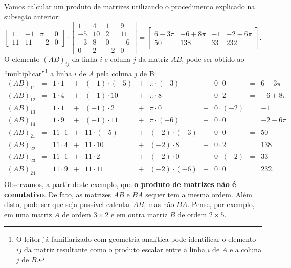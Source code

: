 \documentclass[../livro.tex]{subfiles}  %
\begin{document}
\begin{example} Vamos calcular um produto de matrizes utilizando o procedimento explicado na subseção anterior:
	\begin{equation}
	\left[
	\begin{array}{cccc}
	1 & -1 & \pi & 0 \\
	11 & 11 & -2 & 0 
	\end{array}
	\right] \cdot
	\left[
	\begin{array}{cccc}
	1 & 4 & 1 & 9 \\
	-5 & 10 & 2 & 11 \\
	-3 & 8 & 0 & -6 \\
	0 & 2 & -2 & 0 
	\end{array}
	\right]  =
	\left[
	\begin{array}{cccc}
	6-3\pi   & -6 + 8\pi &   -1   &  -2 - 6 \pi  \\
	50      &  138      &  33    &  232         
	\end{array}
	\right].
	\end{equation} O elemento $(AB)_{ij}$ da linha $i$ e coluna $j$ da matriz $AB$, pode ser obtido ao ``multiplicar''\footnote{O leitor já familiarizado com geometria analítica pode identificar o elemento $ij$ da matriz resultante como o produto escalar entre a linha $i$ de $A$ e a coluna $j$ de $B$.} a linha $i$ de $A$ pela coluna $j$ de B:
	\begin{equation}
	\begin{array}{ccccccccccc}
	(AB)_{11} & = & 1\cdot 1 & + & (-1)\cdot(-5)  & + & \pi \cdot (-3) & + & 0\cdot 0    & = & 6-3\pi \\
	(AB)_{12} & = & 1\cdot 4 & + & (-1)\cdot 10   & + & \pi \cdot 8    & + & 0\cdot 2    & = & -6 + 8 \pi \\
	(AB)_{13} & = & 1\cdot 1 & + & (-1)\cdot 2    & + & \pi \cdot 0    & + & 0\cdot (-2) & = & -1 \\
	(AB)_{14} & = & 1\cdot 9 & + & (-1)\cdot 11   & + & \pi \cdot (-6) & + & 0\cdot 0    & = & -2-6\pi \\
	(AB)_{21} & = & 11\cdot 1& + & 11\cdot(-5)    & + & (-2)\cdot(-3)  & + & 0\cdot 0    & = & 50 \\
	(AB)_{22} & = & 11\cdot 4& + & 11\cdot 10     & + & (-2)\cdot 8    & + & 0\cdot 2    & = & 138 \\
	(AB)_{23} & = & 11\cdot 1& + & 11\cdot 2      & + & (-2)\cdot 0    & + & 0\cdot (-2) & = & 33 \\
	(AB)_{24} & = & 11\cdot 9& + & 11\cdot 11     & + & (-2)\cdot (-6) & + & 0\cdot 0    & = & 232. \\
	\end{array}
	\end{equation} Observamos, a partir deste exemplo, que \textbf{o produto de matrizes não é comutativo}. De fato, as matrizes $AB$ e $BA$ sequer tem a mesma ordem. Além disto, pode ser que seja possível calcular $AB$, mas não $BA$. Pense, por exemplo, em uma matriz $A$ de ordem $3 \times 2$ e em outra matriz $B$ de ordem $2 \times 5$.
\end{example}
\end{document}
